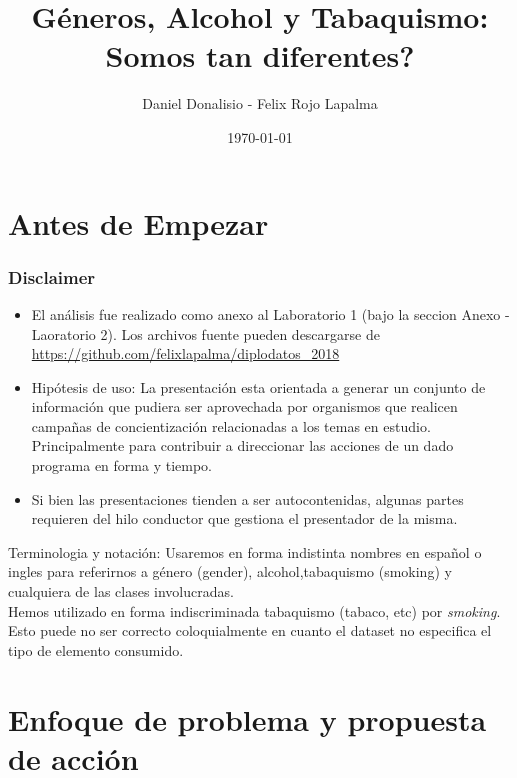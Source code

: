 \documentclass[8pt]{beamer}
\title{Géneros, Alcohol y Tabaquismo: Somos tan diferentes?}
\author{Daniel Donalisio - Felix Rojo Lapalma}
\date{\today}
\begin{document}
\begin{frame}
\titlepage
\end{frame}

\section{Antes de Empezar}
\begin{frame}\frametitle{Disclaimer}
\begin{itemize}
\item El análisis fue realizado como anexo al Laboratorio 1 (bajo la seccion Anexo - Laoratorio 2). Los archivos fuente
pueden descargarse de \url{https://github.com/felixlapalma/diplodatos_2018} 
\item Hipótesis de uso: La presentación esta orientada a generar un conjunto de información que pudiera ser aprovechada por organismos
que realicen campa\~nas de concientizaci\'on relacionadas a los temas en estudio. Principalmente para contribuir a direccionar 
las acciones de un dado programa en forma y tiempo.
\item Si bien las presentaciones tienden a ser autocontenidas, algunas partes requieren del hilo conductor que gestiona el presentador de la misma.
\end{itemize}
Terminologia y notación: Usaremos en forma indistinta nombres en español o ingles para referirnos a género (gender), alcohol,tabaquismo (smoking) y cualquiera de las clases involucradas. \\
Hemos utilizado en forma indiscriminada tabaquismo (tabaco, etc) por \textit{smoking}. Esto puede no ser correcto coloquialmente en cuanto el dataset no especifica el tipo de elemento consumido. 
\end{frame}

\section{Enfoque de problema y propuesta de acción}
\end{document}
